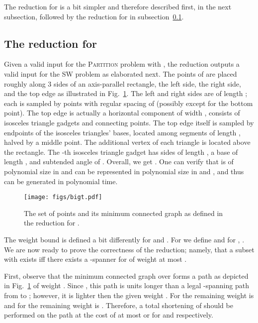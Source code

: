\documentclass[a4paper]{llncs}
\newcommand{\smallt}{}
\newcommand{\bigt}{}
\begin{document}
The reduction for  is a bit simpler and therefore 
described first, in the next subsection,
followed by the reduction for  in subsection~\ref{subsec:t>2}.




\subsection{The reduction for }\label{subsec:t>2}

Given a valid input for the \textsc{Partition} problem  with ,
the reduction outputs a valid input for the SW problem  as elaborated next.
The points of  are placed roughly along 3 sides of an axis-parallel rectangle,
the left side, the right side, and the top edge as illustrated in Fig.~\ref{fig:bigt}. 
The left and right sides are of length ; 
each is sampled by  points
with regular spacing of  (possibly except for the bottom point).
The top edge is actually a horizontal component of width , 
consists of  isosceles triangle gadgets and connecting points.
The top edge itself is sampled by  endpoints of the  isosceles triangles' bases, 
located among  segments of length ,
halved by a middle point. The additional vertex of each triangle is located above the rectangle.
The -th isosceles triangle gadget has sides of length ,
a base of length , and subtended angle of .
Overall, we get .
One can verify that  is of polynomial size in  and can be represented in 
polynomial size in  and , and thus can be generated in polynomial time.
\begin{figure}[htb]
    \centering
        \texttt{[image: figs/bigt.pdf]}
    \caption{The set of points  and its minimum connected graph as defined in the reduction for .}
    \label{fig:bigt}
\end{figure}


The weight bound  is defined a bit differently for \smallt{} and \bigt{}.
For \smallt{} we define 
and for  \bigt{}, .
We are now ready to prove the correctness of the reduction; namely, 
that a subset  with  exists 
iff there exists a -spanner for  of weight at most .

First, observe that the minimum connected graph over  forms a path
 as depicted in Fig.~\ref{fig:bigt}
of weight .
Since , this path is  units longer than a legal
-spanning path from  to ;
however, it is lighter then the given weight .
For \smallt{} the remaining weight is 
and for \bigt{} the remaining weight is .
Therefore, a total shortening of  should be performed on the path
at the cost of at most  or  for \smallt{} and \bigt{} respectively.
\end{document}
